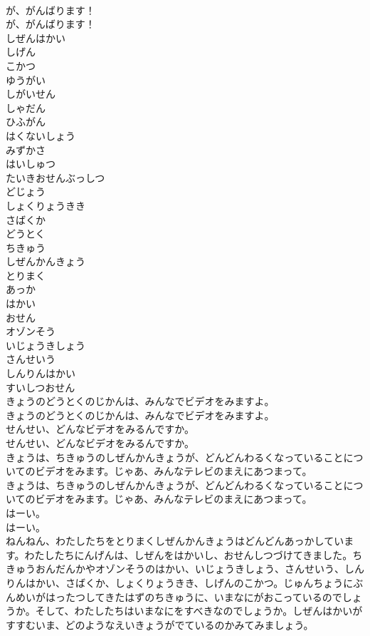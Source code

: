 \documentclass[8pt]{extreport}
\begin{document}
\begin{CJK}{UTF8}{min}
\\	が、がんばります！	
\\	が、がんばります！ 
\\	しぜんはかい
\\	しげん
\\	こかつ
\\	ゆうがい
\\	しがいせん
\\	しゃだん
\\	ひふがん
\\	はくないしょう
\\	みずかさ
\\	はいしゅつ
\\	たいきおせんぶっしつ
\\	どじょう
\\	しょくりょうきき
\\	さばくか
\\	どうとく
\\	ちきゅう
\\	しぜんかんきょう
\\	とりまく
\\	あっか
\\	はかい
\\	おせん
\\	オゾンそう
\\	いじょうきしょう
\\	さんせいう
\\	しんりんはかい
\\	すいしつおせん
\\	きょうのどうとくのじかんは、みんなでビデオをみますよ。	
\\	きょうのどうとくのじかんは、みんなでビデオをみますよ。 
\\	せんせい、どんなビデオをみるんですか。	
\\	せんせい、どんなビデオをみるんですか。 
\\	きょうは、ちきゅうのしぜんかんきょうが、どんどんわるくなっていることについてのビデオをみます。じゃあ、みんなテレビのまえにあつまって。	
\\	きょうは、ちきゅうのしぜんかんきょうが、どんどんわるくなっていることについてのビデオをみます。じゃあ、みんなテレビのまえにあつまって。 
\\	はーい。	
\\	はーい。 
\\	ねんねん、わたしたちをとりまくしぜんかんきょうはどんどんあっかしています。わたしたちにんげんは、しぜんをはかいし、おせんしつづけてきました。ちきゅうおんだんかやオゾンそうのはかい、いじょうきしょう、さんせいう、しんりんはかい、さばくか、しょくりょうきき、しげんのこかつ。じゅんちょうにぶんめいがはったつしてきたはずのちきゅうに、いまなにがおこっているのでしょうか。そして、わたしたちはいまなにをすべきなのでしょうか。しぜんはかいがすすむいま、どのようなえいきょうがでているのかみてみましょう。	

\end{CJK}
\end{document}
